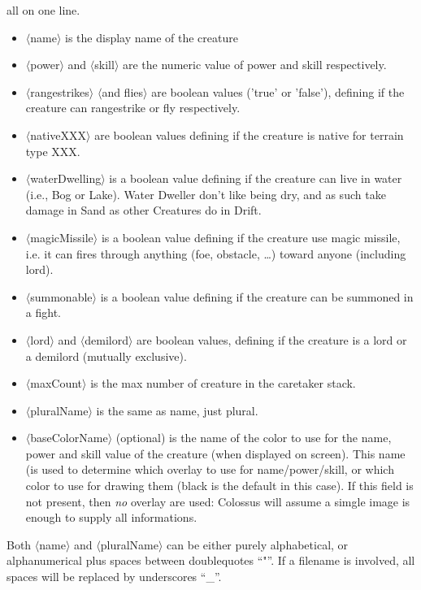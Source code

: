 \documentclass{article}
\begin{document}
all on one line.

\begin{itemize}
\item $\langle$name$\rangle$ is the display name of the creature
\item $\langle$power$\rangle$ and $\langle$skill$\rangle$ are the numeric value of power and skill respectively.
\item $\langle$rangestrikes$\rangle$ $\langle$and flies$\rangle$ are boolean values ('true' or 'false'), defining if the creature can rangestrike or fly respectively.
\item $\langle$nativeXXX$\rangle$ are boolean values defining if the creature is native for terrain type XXX.
\item $\langle$waterDwelling$\rangle$ is a boolean value defining if the creature can live in water (i.e., Bog or Lake). Water Dweller don't like being dry, and as such take damage in Sand as other Creatures do in Drift.
\item $\langle$magicMissile$\rangle$ is a boolean value defining if the creature use magic missile, i.e. it can fires through anything (foe, obstacle, \ldots) toward anyone (including lord).
\item $\langle$summonable$\rangle$ is a boolean value defining if the creature can be summoned in a fight.
\item $\langle$lord$\rangle$ and $\langle$demilord$\rangle$ are boolean values, defining if the creature is a lord or a demilord (mutually exclusive).
\item $\langle$maxCount$\rangle$ is the max number of creature in the caretaker stack.
\item $\langle$pluralName$\rangle$ is the same as name, just plural.
\item $\langle$baseColorName$\rangle$ (optional) is the name of the color to use for the name, power and skill value of the creature (when displayed on screen). This name (is used to determine which overlay to use for name/power/skill, or which color to use for drawing them (black is the default in this case). If this field is not present, then \emph{no} overlay are used: Colossus will assume a simgle image is enough to supply all informations.
\end{itemize}

Both $\langle$name$\rangle$ and $\langle$pluralName$\rangle$ can be either purely alphabetical, or alphanumerical plus spaces between doublequotes ``"''. If a filename is involved, all spaces will be replaced by underscores ``\_''.
\end{document}
